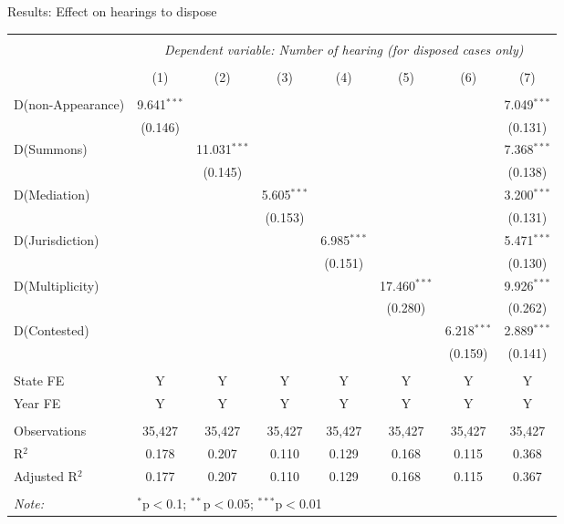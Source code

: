 \documentclass[10pt,aspectratio=169]{beamer}
\begin{document}
\begin{frame}{Results: Effect on hearings to dispose}
  \scriptsize
  \begin{longtable}{lccccccc}
    \\[-1.8ex]
    \hline \\[-1.8ex]
    & \multicolumn{7}{c}{\textit{Dependent variable: Number of hearing (for disposed cases only)}} \\
    \cline{2-8}
    \\[-1.8ex] & (1) & (2) & (3) & (4) & (5) & (6) & (7)\\
    \hline \\[-1.8ex]
    D(non-Appearance) & 9.641$^{***}$ & & & & & & 7.049$^{***}$ \\
    & (0.146) & & & & & & (0.131) \\\hline
    D(Summons) & & 11.031$^{***}$ & & & & & 7.368$^{***}$ \\
    & & (0.145) & & & & & (0.138) \\\hline
    D(Mediation) & & & 5.605$^{***}$ & & & & 3.200$^{***}$ \\
    & & & (0.153) & & & & (0.131) \\\hline
    D(Jurisdiction) & & & & 6.985$^{***}$ & & & 5.471$^{***}$ \\
    & & & & (0.151) & & & (0.130) \\\hline
    D(Multiplicity) & & & & & 17.460$^{***}$ & & 9.926$^{***}$ \\
    & & & & & (0.280) & & (0.262) \\\hline
    D(Contested) & & & & & & 6.218$^{***}$ & 2.889$^{***}$ \\
    & & & & & & (0.159) & (0.141) \\
    \hline \\[-1.8ex]
    State FE & Y & Y & Y & Y & Y & Y & Y \\
    Year FE & Y & Y & Y & Y & Y & Y & Y \\
    \hline \\[-1.8ex]
    Observations & 35,427 & 35,427 & 35,427 & 35,427 & 35,427 & 35,427 & 35,427 \\
    R$^{2}$ & 0.178 & 0.207 & 0.110 & 0.129 & 0.168 & 0.115 & 0.368 \\
    Adjusted R$^{2}$ & 0.177 & 0.207 & 0.110 & 0.129 & 0.168 & 0.115 & 0.367 \\
    \hline \\[-1.8ex]
    \textit{Note:} & \multicolumn{7}{l}{$^{*}$p$<$0.1; $^{**}$p$<$0.05; $^{***}$p$<$0.01} \\
  \end{longtable}
\end{frame}
\end{document}
